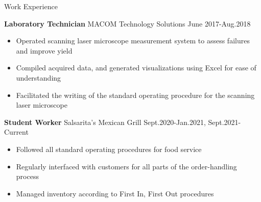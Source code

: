 \documentclass{resume} \usepackage{multirow}
\begin{document}
        \begin{rSection}{Work Experience}
    	    \vspace{-1.25em}
        \item \textbf{Laboratory Technician} {MACOM Technology Solutions} \hfill June 2017-Aug.2018
            \begin{itemize}
                \itemsep -5pt {}
                \item Operated scanning laser microscope measurement system to assess failures and improve yield
                \item Compiled acquired data, and generated visualizations using Excel for ease of understanding
                \item Facilitated the writing of the standard operating procedure for the scanning laser microscope
            \end{itemize}
        \item \textbf{Student Worker} {Salsarita's Mexican Grill} \hfill Sept.2020-Jan.2021, Sept.2021-Current
            \begin{itemize}
                \itemsep -5pt {}
                \item Followed all standard operating procedures for food service
                \item Regularly interfaced with customers for all parts of the order-handling process
                \item Managed inventory according to First In, First Out procedures
            \end{itemize}
        \end{rSection}
\end{document}
